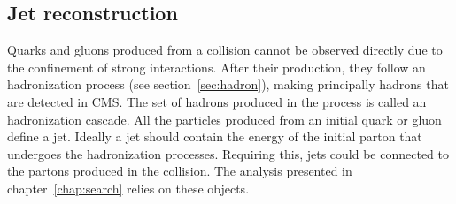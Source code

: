 %
%
%
%

\subsection{Jet reconstruction}
\label{sec:jets}

Quarks and gluons produced from a collision cannot be observed directly due to the confinement of strong interactions. After their production, they follow an hadronization process (see section~\ref{sec:hadron}), making principally hadrons that are detected in CMS. The set of hadrons produced in the process is called an hadronization cascade. All the particles produced from an initial quark or gluon define a jet. Ideally a jet should contain the energy of the initial parton that undergoes the hadronization processes. Requiring this, jets could be connected to the partons produced in the collision. The analysis presented in chapter~\ref{chap:search} relies on these objects.

